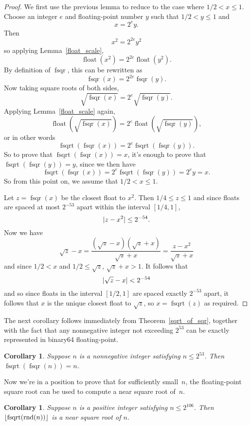 \documentclass[a4paper]{article}
\DeclarePairedDelimiter\floor{\lfloor}{\rfloor}
\DeclarePairedDelimiter\abs{\lvert}{\rvert}
\DeclareMathOperator{\rnd}{rnd}
\DeclareMathOperator{\fsqrt}{fsqrt}
\DeclareMathOperator{\fsqr}{fsqr}
\DeclareMathOperator{\float}{float}
\theoremstyle{plain}
\newtheorem{corollary}[theorem]{Corollary}
\theoremstyle{definition}
\begin{document}
\begin{proof}
  We first use the previous lemma to reduce to the case where $1/2 < x \le 1$.
  Choose an integer $e$ and floating-point number $y$ such that $1/2 < y \le 1$
  and
  $$x = 2^e y.$$
  Then
  $$x^2 = 2^{2e}y^2$$
  so applying Lemma~\ref{float_scale},
  $$\float(x^2) = 2^{2e}\float(y^2).$$
  By definition of $\fsqr$, this can be rewritten as
  $$\fsqr(x) = 2^{2e}\fsqr(y).$$
  Now taking square roots of both sides,
  $$\sqrt{\fsqr(x)} = 2^e \sqrt{\fsqr(y)}.$$
  Applying Lemma~\ref{float_scale} again,
  $$\float(\sqrt{\fsqr(x)}) = 2^e \float(\sqrt{\fsqr(y)}),$$
  or in other words
  $$\fsqrt(\fsqr(x)) = 2^e \fsqrt(\fsqr(y)).$$
  So to prove that $\fsqrt(\fsqr(x)) = x$, it's enough to prove that
  $\fsqrt(\fsqr(y)) = y$, since we then have
  $$\fsqrt(\fsqr(x)) = 2^e \fsqrt(\fsqr(y)) = 2^e y = x.$$
  So from this point on, we assume that $1/2 < x \le 1$.

  Let $z = \fsqr(x)$ be the closest float to $x^2$. Then $1/4 \le z \le 1$ and
  since floats are spaced at most $2^{-53}$ apart within the interval $[1/4,
  1]$,
  $$\abs{z - x^2} \le 2^{-54}.$$ Now we have
  $$\sqrt z - x = \frac{(\sqrt z - x)(\sqrt z + x)}{\sqrt z + x} = \frac{z -
  x^2}{\sqrt z + x}$$ and since $1/2 < x$ and $1/2 \le \sqrt z $, $\sqrt z + x
  > 1$. It follows that
  $$\abs{\sqrt z - x} < 2^{-54}$$ and so since floats in the interval $[1/2,
  1]$ are spaced exactly $2^{-53}$ apart, it follows that $x$ is the unique
  closest float to $\sqrt z$, so $x = \fsqrt(z)$ as required.
\end{proof}

The next corollary follows immediately from Theorem~\ref{sqrt_of_sqr}, together
with the fact that any nonnegative integer not exceeding $2^{53}$ can be
exactly represented in binary64 floating-point.

\begin{corollary}
  Suppose $n$ is a nonnegative integer satisfying $n \le 2^{53}$. Then
  $\fsqrt(\fsqr(n)) = n$.
\end{corollary}

Now we're in a position to prove that for sufficiently small~$n$, the
floating-point square root can be used to compute a near square root of~$n$.

\begin{corollary}
  Suppose $n$ is a positive integer satisfying $n \le 2^{106}$. Then
  $\floor{\fsqrt(\rnd(n))}$ is a near square root of $n$.
\end{corollary}
\end{document}

